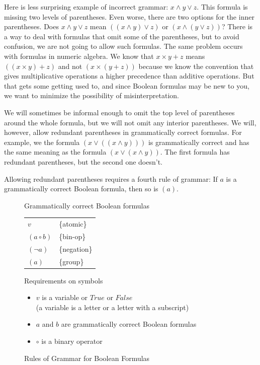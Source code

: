 Here is less surprising example of incorrect grammar: $x \wedge y \vee z$. This formula is missing two levels of parentheses. Even worse, there are two options for the inner parentheses. Does $x \wedge y \vee z$ mean $((x \wedge y) \vee z)$ or $(x \wedge (y \vee z))$? There is a way to deal with formulas that omit some of the parentheses, but to avoid confusion, we are not going to allow such formulas. The same problem occurs with formulas in numeric algebra. We know that $x \times y + z$ means $((x \times y) + z)$ and not $(x \times (y + z))$ because we know the convention that gives multiplicative operations a higher precedence than additive operations. But that gets some getting used to, and since Boolean formulas may be new to you, we want to minimize the possibility of misinterpretation.

We will sometimes be informal enough to omit the top level of parentheses around the whole formula, but we will not omit any interior parentheses.
We will, however, allow redundant parentheses in grammatically correct formulas. For example, we the formula $(x \vee ((x \wedge y)))$ is grammatically correct and has the same meaning as the formula $(x \vee (x \wedge y))$. The first formula has redundant parentheses, but the second one doesn't.

Allowing redundant parentheses requires a fourth rule of grammar: If $a$ is a grammatically correct Boolean formula, then so is $(a)$.

\begin{figure}
Grammatically correct Boolean formulas
\begin{center}
\begin{tabular}{ll}
$v$                                     & \{atomic\} \\
$(a \circ b)$                           & \{bin-op\} \\
$(\neg a)$                              & \{negation\} \\
$(a)$                                   & \{group\} \\
\end{tabular}
\end{center}
Requirements on symbols
\begin{itemize}
\item $v$ is a variable or $True$ or $False$
\\(a variable is a letter or a letter with a subscript)
\item $a$ and $b$ are grammatically correct Boolean formulas
\item $\circ$ is a binary operator
\end{itemize}
\caption{Rules of Grammar for Boolean Formulas}
\label{fig-02-grammar}
\end{figure}

